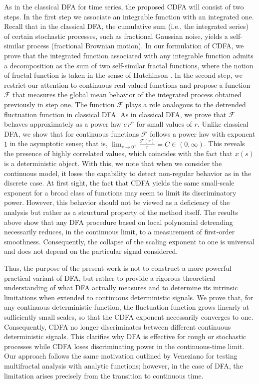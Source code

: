 \documentclass{amsart}
\begin{document}
As in the classical DFA for time series, the proposed CDFA  will consist of two steps. In the first step we associate an integrable function with an integrated one.  Recall that in the classical DFA, the cumulative sum  (i.e., the integrated series) of certain stochastic processes, such as fractional Gaussian noise, yields a self-similar process (fractional Brownian motion). In our  formulation of CDFA, we prove that the integrated function associated with any integrable function admits a decomposition as the sum of two self-similar fractal functions, where the notion of fractal function is taken in the sense of Hutchinson \cite{Hut, Hut2}.
In the second step, we restrict our attention to continuous real-valued functions and propose a function $\mathcal{F}$ that measures the global mean behavior of the integrated process obtained previously in step one. The function $\mathcal{F}$ plays a role analogous to the detrended fluctuation function in classical DFA. As in classical DFA, we prove that $\mathcal{F}$ behaves approximately as a power law $c\,r^\alpha$ for small values of $r$. Unlike classical DFA, we show that for continuous functions $\mathcal{F}$ follows a power law with exponent $1$ in the asymptotic sense; that is, $ \lim_{r \to 0^+} \frac{\mathcal{F}(r)}{r} = C \in (0,\infty)$. This reveals the presence of highly correlated values, which coincides with the fact that $x(s)$ is a deterministic object. With this, we note that when we consider the continuous model, it loses the capability to detect non-regular behavior as in the discrete case. At first sight, the fact that CDFA yields the same small-scale
exponent for a broad class of functions may seem to limit its
discriminatory power. However, this behavior should not be viewed as a
deficiency of the analysis but rather as a structural property of the
method itself. The results above show that any DFA procedure based on
local polynomial detrending necessarily reduces, in the continuous
limit, to a measurement of first-order smoothness. Consequently, the
collapse of the scaling exponent to one is universal and does not depend
on the particular signal considered. 

Thus, the purpose of the present work is not to construct a more powerful practical variant of DFA, but rather to provide a rigorous theoretical understanding of what DFA actually measures and to determine its intrinsic limitations when extended to continuous deterministic signals. We prove that, for any continuous deterministic function, the fluctuation function grows linearly at sufficiently small scales, so that the CDFA exponent necessarily converges to one. Consequently, CDFA no longer discriminates between different continuous deterministic signals. This clarifies why DFA is effective for rough or stochastic processes while CDFA loses discriminating
power in the continuous-time limit. Our approach follows the same motivation outlined by Veneziano \cite{veneziano} for testing multifractal analysis with analytic functions; however, in the case of DFA, the limitation arises precisely from the transition to continuous time.
\end{document}
